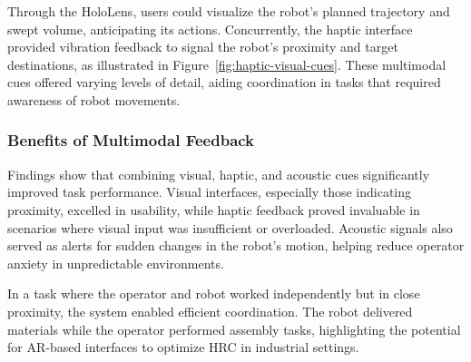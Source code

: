 Through the HoloLens, users could visualize the robot's planned trajectory and swept volume, anticipating its actions. Concurrently, the haptic interface provided vibration feedback to signal the robot's proximity and target destinations, as illustrated in Figure~\ref{fig:haptic-visual-cues}. These multimodal cues offered varying levels of detail, aiding coordination in tasks that required awareness of robot movements.

\subsubsection{Benefits of Multimodal Feedback}

Findings show that combining visual, haptic, and acoustic cues significantly improved task performance. Visual interfaces, especially those indicating proximity, excelled in usability, while haptic feedback proved invaluable in scenarios where visual input was insufficient or overloaded. Acoustic signals also served as alerts for sudden changes in the robot's motion, helping reduce operator anxiety in unpredictable environments.

In a task where the operator and robot worked independently but in close proximity, the system enabled efficient coordination. The robot delivered materials while the operator performed assembly tasks, highlighting the potential for \ac{AR}-based interfaces to optimize \ac{HRC} in industrial settings.

